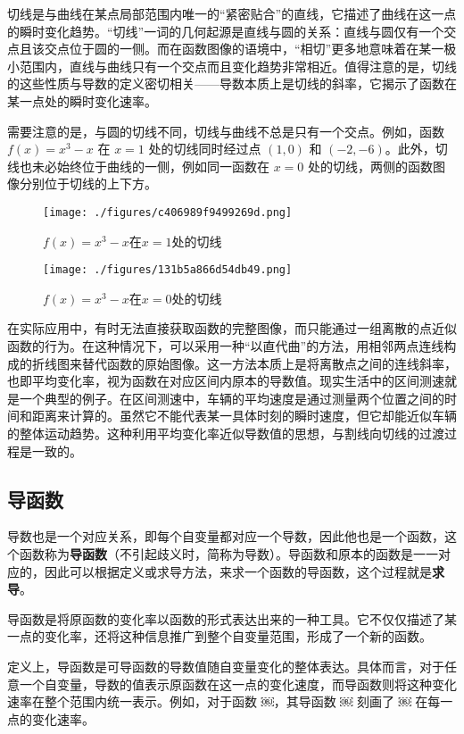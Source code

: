 切线是与曲线在某点局部范围内唯一的“紧密贴合”的直线，它描述了曲线在这一点的瞬时变化趋势。“切线”一词的几何起源是直线与圆的关系：直线与圆仅有一个交点且该交点位于圆的一侧。而在函数图像的语境中，“相切”更多地意味着在某一极小范围内，直线与曲线只有一个交点而且变化趋势非常相近。值得注意的是，切线的这些性质与导数的定义密切相关——导数本质上是切线的斜率，它揭示了函数在某一点处的瞬时变化速率。

需要注意的是，与圆的切线不同，切线与曲线不总是只有一个交点。例如，函数 $f(x) = x^3 - x$ 在 $x = 1$ 处的切线同时经过点 $(1, 0)$ 和 $(-2, -6)$。此外，切线也未必始终位于曲线的一侧，例如同一函数在 $x = 0$ 处的切线，两侧的函数图像分别位于切线的上下方。

\begin{figure}[ht]
\centering
\texttt{[image: ./figures/c406989f9499269d.png]}
\caption{$f(x)=x^3-x$在$x=1$处的切线} \label{fig_HsDerv_1}
\end{figure}

\begin{figure}[ht]
\centering
\texttt{[image: ./figures/131b5a866d54db49.png]}
\caption{$f(x)=x^3-x$在$x=0$处的切线} \label{fig_HsDerv_2}
\end{figure}

在实际应用中，有时无法直接获取函数的完整图像，而只能通过一组离散的点近似函数的行为。在这种情况下，可以采用一种“以直代曲”的方法，用相邻两点连线构成的折线图来替代函数的原始图像。这一方法本质上是将离散点之间的连线斜率，也即平均变化率，视为函数在对应区间内原本的导数值。现实生活中的区间测速就是一个典型的例子。在区间测速中，车辆的平均速度是通过测量两个位置之间的时间和距离来计算的。虽然它不能代表某一具体时刻的瞬时速度，但它却能近似车辆的整体运动趋势。这种利用平均变化率近似导数值的思想，与割线向切线的过渡过程是一致的。

\subsection{导函数}

导数也是一个对应关系，即每个自变量都对应一个导数，因此他也是一个函数，这个函数称为\textbf{导函数}（不引起歧义时，简称为导数）。导函数和原本的函数是一一对应的，因此可以根据定义或求导方法，来求一个函数的导函数，这个过程就是\textbf{求导}。

导函数是将原函数的变化率以函数的形式表达出来的一种工具。它不仅仅描述了某一点的变化率，还将这种信息推广到整个自变量范围，形成了一个新的函数。

定义上，导函数是可导函数的导数值随自变量变化的整体表达。具体而言，对于任意一个自变量，导数的值表示原函数在这一点的变化速度，而导函数则将这种变化速率在整个范围内统一表示。例如，对于函数 ￼，其导函数 ￼ 刻画了 ￼ 在每一点的变化速率。

